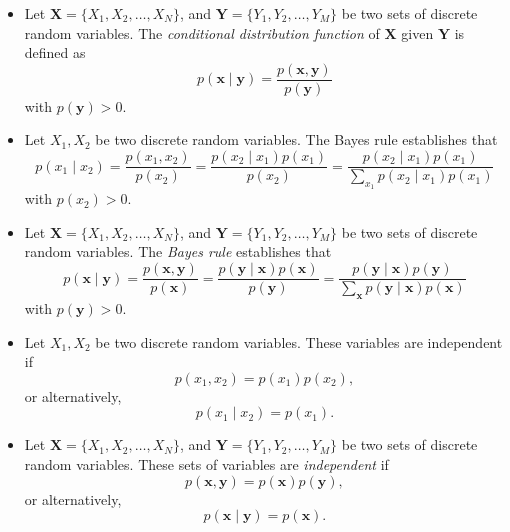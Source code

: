 \documentclass{tufte-handout}
\begin{document}
\begin{itemize}
  \vspace{0.5cm}
 \item  Let $\mathbf X = \{X_1, X_2,\dots,X_N\}$, and $\mathbf Y = \{Y_1, Y_2,\dots,Y_M\}$ be two sets of discrete random variables. The \textit{conditional distribution function} of $\mathbf X$ given  $\mathbf Y $ is  defined as 
 \begin{equation*}  
 p(\mathbf x\mid \mathbf y) = \frac{p(\mathbf x,\mathbf y)}{p(\mathbf y)}
 \end{equation*} 
 with $p(\mathbf y)> 0$.
 
 \item   Let $X_1, X_2$ be two discrete random variables. The Bayes rule establishes that
 \begin{equation*}  
 p(x_1\mid x_2) = \frac{p(x_1,x_2)}{p(x_2)}=\frac{p(x_2\mid x_1)p(x_1)}{p(x_2)}=\frac{p(x_2\mid x_1)p(x_1)}{\sum_{x_1} p(x_2\mid x_1)p(x_1)}
 \end{equation*} 
 with $p(x_2)> 0$.

 \item Let $\mathbf X = \{X_1, X_2,\dots,X_N\}$, and $\mathbf Y = \{Y_1, Y_2,\dots,Y_M\}$ be two sets of discrete random variables. The \textit{Bayes rule} establishes that
 \begin{equation*}  
 p(\mathbf x \mid \mathbf y ) = \frac{p(\mathbf x, \mathbf y)}{p(\mathbf x)} = \frac{p(\mathbf y \mid \mathbf x )p(\mathbf x )}{p(\mathbf y )}=\frac{p(\mathbf y \mid\mathbf x )p(\mathbf y )}{\sum_{\mathbf x } p(\mathbf y \mid \mathbf x )p(\mathbf x )}
 \end{equation*} 
 with $p(\mathbf y )> 0$. 
 
 \item Let $X_1, X_2$ be two discrete random variables. These variables are independent if 
 \begin{equation*}  
 p(x_1, x_2) = p(x_1)p(x_2),
 \end{equation*}  
 or alternatively,
 \begin{equation*}  
 p(x_1\mid x_2) = p(x_1).
  \end{equation*} 
  
\item Let $\mathbf X = \{X_1, X_2,\dots,X_N\}$, and $\mathbf Y = \{Y_1, Y_2,\dots,Y_M\}$ be two sets of discrete random variables. These sets of  variables are \textit{independent} if 
 \begin{equation*}  
 p(\mathbf x, \mathbf y) = p(\mathbf x)p(\mathbf y),
 \end{equation*}  
 or alternatively,
 \begin{equation*}  
 p(\mathbf x\mid \mathbf y) = p(\mathbf x).
  \end{equation*}   
  

\end{itemize}
\end{document}
